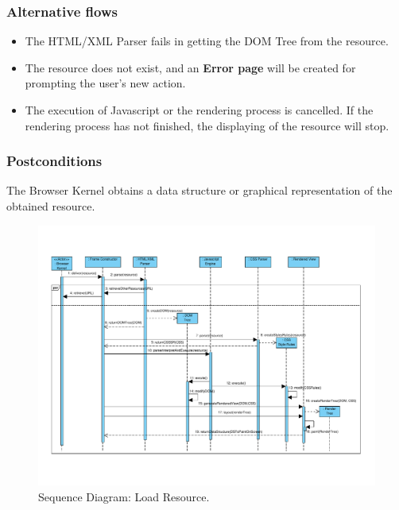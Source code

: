 \documentclass[]{acmlarge}
\begin{document}
    \subsubsection*{Alternative flows} 
    \begin{itemize}\leftskip2.2em
    \item The HTML/XML Parser fails in getting the DOM Tree from the resource.
    \item The resource does not exist, and an \textbf{Error page} will be created for prompting the user's new action.
    \item The execution of Javascript or the rendering process is cancelled. If the rendering process has not finished, the displaying of the resource will stop.
      \end{itemize}
    \subsubsection*{Postconditions} The Browser Kernel obtains a data structure or graphical representation of the obtained resource.


    \begin{landscape}
      \begin{figure}[h!t]
      \vspace*{-2cm}
          \centering
          \hspace*{-1cm}\includegraphics[scale=0.8]{figures/LoadResource-v3.pdf}
          \vspace*{-2.2cm}
          \caption{Sequence Diagram: Load Resource.}
          \label{fig:LoadResource}
      \end{figure}
    \end{landscape}
\end{document}
